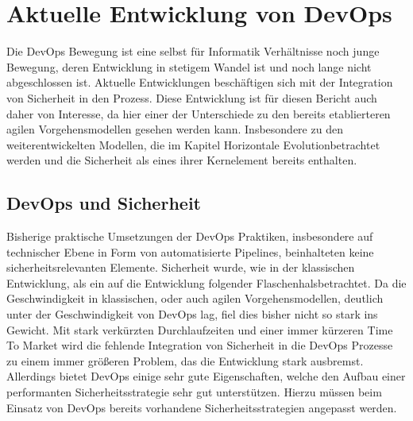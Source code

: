 \section{Aktuelle Entwicklung von DevOps} %
Die DevOps Bewegung ist eine selbst für Informatik Verhältnisse noch junge Bewegung, deren Entwicklung in stetigem Wandel ist und noch lange nicht abgeschlossen ist. Aktuelle Entwicklungen beschäftigen sich mit der Integration von Sicherheit in den Prozess. Diese Entwicklung ist für diesen Bericht auch daher von Interesse, da hier einer der Unterschiede zu den bereits etablierteren agilen Vorgehensmodellen gesehen werden kann. Insbesondere zu den weiterentwickelten Modellen, die im Kapitel \glqq Horizontale Evolution\grqq betrachtet werden und die Sicherheit als eines ihrer Kernelement bereits enthalten.

\subsection{DevOps und Sicherheit}
Bisherige praktische Umsetzungen der DevOps Praktiken, insbesondere auf technischer Ebene in Form von automatisierte Pipelines, beinhalteten keine sicherheitsrelevanten Elemente. Sicherheit wurde, wie in der klassischen Entwicklung, als ein auf die Entwicklung folgender \glqq Flaschenhals\grqq betrachtet. Da die Geschwindigkeit in klassischen, oder auch agilen Vorgehensmodellen, deutlich unter der Geschwindigkeit von DevOps lag, fiel dies bisher nicht so stark ins Gewicht. Mit stark verkürzten Durchlaufzeiten und einer immer kürzeren Time To Market wird die fehlende Integration von Sicherheit in die DevOps Prozesse zu einem immer größeren Problem, das die Entwicklung stark ausbremst. Allerdings bietet DevOps einige sehr gute Eigenschaften, welche den Aufbau einer performanten Sicherheitsstrategie sehr gut unterstützen. Hierzu müssen beim Einsatz von DevOps bereits vorhandene Sicherheitsstrategien angepasst werden.


